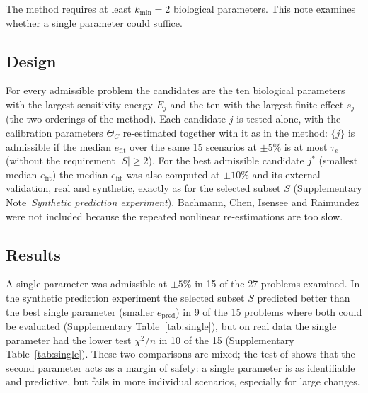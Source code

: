 
The method requires at least $k_{\min}=2$ biological parameters. This note examines whether a single parameter could suffice.

\subsection*{Design}
For every admissible problem the candidates are the ten biological parameters with the largest sensitivity energy $E_j$ and the ten with the largest finite effect $s_j$ (the two orderings of the method). Each candidate $j$ is tested alone, with the calibration parameters $\Theta_C$ re-estimated together with it as in the method: $\{j\}$ is admissible if the median $e_{\mathrm{fit}}$ over the same 15 scenarios at $\pm5\%$ is at most $\tau_e$ (without the requirement $|S|\ge2$). For the best admissible candidate $j^\ast$ (smallest median $e_{\mathrm{fit}}$) the median $e_{\mathrm{fit}}$ was also computed at $\pm10\%$ and its external validation, real and synthetic, exactly as for the selected subset $S$ (Supplementary Note~\emph{Synthetic prediction experiment}). Bachmann, Chen, Isensee and Raimundez were not included because the repeated nonlinear re-estimations are too slow.

\subsection*{Results}
A single parameter was admissible at $\pm5\%$ in 15 of the 27 problems examined. In the synthetic prediction experiment the selected subset $S$ predicted better than the best single parameter (smaller $e_{\mathrm{pred}}$) in 9 of the 15 problems where both could be evaluated (Supplementary Table~\ref{tab:single}), but on real data the single parameter had the lower test $\chi^2/n$ in 10 of the 15 (Supplementary Table~\ref{tab:single}). These two comparisons are mixed; the test of  shows that the second parameter acts as a margin of safety: a single parameter is as identifiable and predictive, but fails in more individual scenarios, especially for large changes.

